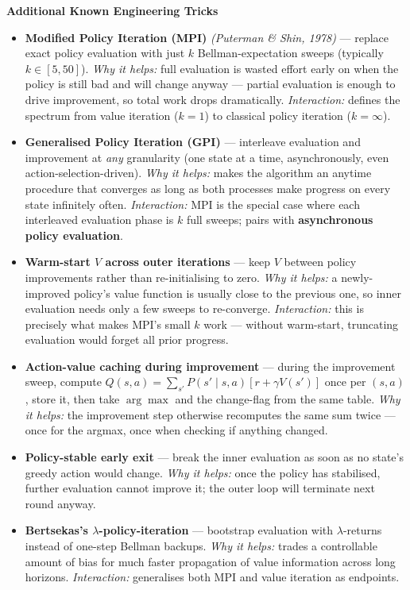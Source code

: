 \documentclass[11pt]{article}
\begin{document}
    \label{tricks-1-2}

    \textbf{Additional Known Engineering Tricks}

\begin{itemize}
\item
  \label{trick-1-2-1}\textbf{Modified Policy Iteration
  (MPI)} \emph{(Puterman \& Shin, 1978)} --- replace exact policy
  evaluation with just \(k\) Bellman-expectation sweeps (typically
  \(k\in[5,50]\)). \emph{Why it helps:} full evaluation is wasted effort
  early on when the policy is still bad and will change anyway ---
  partial evaluation is enough to drive improvement, so total work drops
  dramatically. \emph{Interaction:} defines the spectrum from value
  iteration (\(k=1\)) to classical policy iteration (\(k=\infty\)).
\item
  \label{trick-1-2-2}\textbf{Generalised Policy Iteration
  (GPI)} --- interleave evaluation and improvement at \emph{any}
  granularity (one state at a time, asynchronously, even
  action-selection-driven). \emph{Why it helps:} makes the algorithm an
  anytime procedure that converges as long as both processes make
  progress on every state infinitely often. \emph{Interaction:} MPI is
  the special case where each interleaved evaluation phase is \(k\) full
  sweeps; pairs with \textbf{asynchronous policy evaluation}.
\item
  \label{trick-1-2-3}\textbf{Warm-start \(V\) across
  outer iterations} --- keep \(V\) between policy improvements rather
  than re-initialising to zero. \emph{Why it helps:} a newly-improved
  policy's value function is usually close to the previous one, so inner
  evaluation needs only a few sweeps to re-converge. \emph{Interaction:}
  this is precisely what makes MPI's small \(k\) work --- without
  warm-start, truncating evaluation would forget all prior progress.
\item
  \label{trick-1-2-4}\textbf{Action-value caching during
  improvement} --- during the improvement sweep, compute
  \(Q(s,a)=\sum_{s'} P(s'\mid s,a)[r+\gamma V(s')]\) once per \((s,a)\),
  store it, then take \(\arg\max\) and the change-flag from the same
  table. \emph{Why it helps:} the improvement step otherwise recomputes
  the same sum twice --- once for the argmax, once when checking if
  anything changed.
\item
  \label{trick-1-2-5}\textbf{Policy-stable early exit}
  --- break the inner evaluation as soon as no state's greedy action
  would change. \emph{Why it helps:} once the policy has stabilised,
  further evaluation cannot improve it; the outer loop will terminate
  next round anyway.
\item
  \label{trick-1-2-6}\textbf{Bertsekas's
  \(\lambda\)-policy-iteration} --- bootstrap evaluation with
  \(\lambda\)-returns instead of one-step Bellman backups. \emph{Why it
  helps:} trades a controllable amount of bias for much faster
  propagation of value information across long horizons.
  \emph{Interaction:} generalises both MPI and value iteration as
  endpoints.
\end{itemize}
\end{document}
